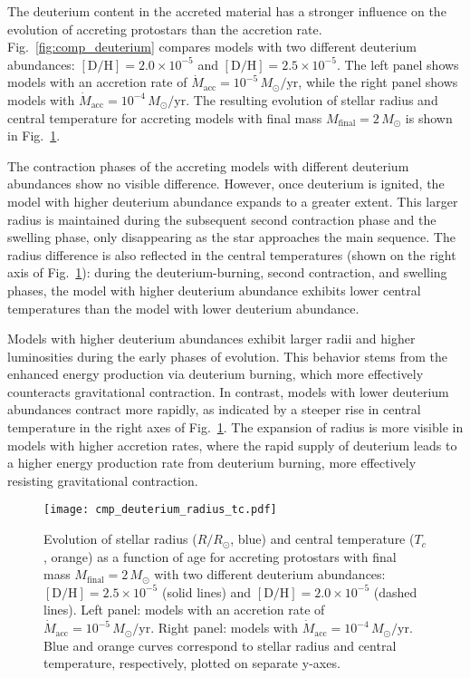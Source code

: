 \documentclass[12pt,a4paper]{article}
\newcommand{\mr}{\mathrm}
\begin{document}
The deuterium content in the accreted material has a stronger influence on the evolution of accreting protostars than the accretion rate. Fig.~\ref{fig:comp_deuterium} compares models with two different deuterium abundances: $[\mr{D/H}] = 2.0 \times 10^{-5}$ and $[\mr{D/H}] = 2.5 \times 10^{-5}$. The left panel shows models with an accretion rate of $\dot{M}_\mr{acc} = 10^{-5}\,M_\odot/\mr{yr}$, while the right panel shows models with $\dot{M}_\mr{acc} = 10^{-4}\,M_\odot/\mr{yr}$. The resulting evolution of stellar radius and central temperature for accreting models with final mass $M_\mr{final} = 2\,M_\odot$ is shown in Fig.~\ref{fig:comp_deuterium_radius_tc}.

The contraction phases of the accreting models with different deuterium abundances show no visible difference. However, once deuterium is ignited, the model with higher deuterium abundance expands to a greater extent. This larger radius is maintained during the subsequent second contraction phase and the swelling phase, only disappearing as the star approaches the main sequence. The radius difference is also reflected in the central temperatures (shown on the right axis of Fig.~\ref{fig:comp_deuterium_radius_tc}): during the deuterium-burning, second contraction, and swelling phases, the model with higher deuterium abundance exhibits lower central temperatures than the model with lower deuterium abundance.

Models with higher deuterium abundances exhibit larger radii and higher luminosities during the early phases of evolution. This behavior stems from the enhanced energy production via deuterium burning, which more effectively counteracts gravitational contraction. In contrast, models with lower deuterium abundances contract more rapidly, as indicated by a steeper rise in central temperature in the right axes of Fig.~\ref{fig:comp_deuterium_radius_tc}. The expansion of radius is more visible in models with higher accretion rates, where the rapid supply of deuterium leads to a higher energy production rate from deuterium burning, more effectively resisting gravitational contraction.

\begin{figure}
  \centering
  \texttt{[image: cmp\_deuterium\_radius\_tc.pdf]}
  \caption{Evolution of stellar radius ($R/R_\odot$, blue) and central temperature ($T_c$, orange) as a function of age for accreting protostars with final mass $M_\mr{final} = 2\,M_\odot$ with two different deuterium abundances: $[\mr{D/H}] = 2.5 \times 10^{-5}$ (solid lines) and $[\mr{D/H}] = 2.0 \times 10^{-5}$ (dashed lines). Left panel: models with an accretion rate of $\dot{M}_\mr{acc} = 10^{-5}\,M_\odot/\mr{yr}$. Right panel: models with $\dot{M}_\mr{acc} = 10^{-4}\,M_\odot/\mr{yr}$. Blue and orange curves correspond to stellar radius and central temperature, respectively, plotted on separate y-axes.}
  \label{fig:comp_deuterium_radius_tc}
\end{figure}
\end{document}
